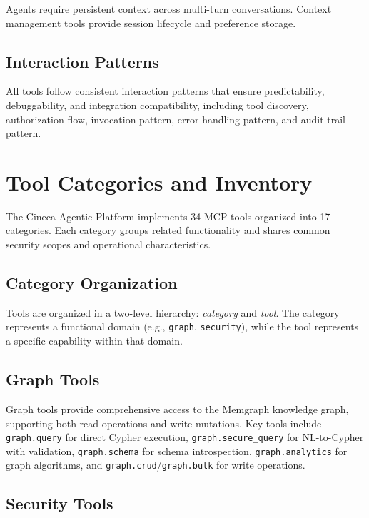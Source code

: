 \documentclass[a4paper,twoside]{sapthesis}
\begin{document}
Agents require persistent context across multi-turn conversations. Context management tools provide session lifecycle and preference storage.

\subsection{Interaction Patterns}
\label{subsec:interaction-patterns}

All tools follow consistent interaction patterns that ensure predictability, debuggability, and integration compatibility, including tool discovery, authorization flow, invocation pattern, error handling pattern, and audit trail pattern.

\section{Tool Categories and Inventory}
\label{sec:tool-inventory}

The Cineca Agentic Platform implements 34 MCP tools organized into 17 categories. Each category groups related functionality and shares common security scopes and operational characteristics.

\subsection{Category Organization}
\label{subsec:category-organization}

Tools are organized in a two-level hierarchy: \textit{category} and \textit{tool}. The category represents a functional domain (e.g., \texttt{graph}, \texttt{security}), while the tool represents a specific capability within that domain.

\subsection{Graph Tools}
\label{subsec:graph-tools}

Graph tools provide comprehensive access to the Memgraph knowledge graph, supporting both read operations and write mutations. Key tools include \texttt{graph.query} for direct Cypher execution, \texttt{graph.secure\_query} for NL-to-Cypher with validation, \texttt{graph.schema} for schema introspection, \texttt{graph.analytics} for graph algorithms, and \texttt{graph.crud}/\texttt{graph.bulk} for write operations.

\subsection{Security Tools}
\label{subsec:security-tools}
\end{document}
